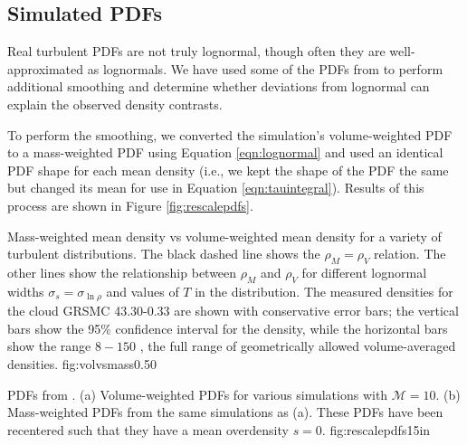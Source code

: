 % 

\subsection{Simulated PDFs}
\label{sec:simpdfs}
Real turbulent PDFs are not truly lognormal, though often they are
well-approximated as lognormals.  We have used some of the PDFs from
\citet{Federrath2012a} to perform additional smoothing and determine
whether deviations from lognormal can explain the observed density contrasts.

To perform the smoothing, we converted the simulation's volume-weighted PDF to
a mass-weighted PDF using Equation \ref{eqn:lognormal} and used an identical
PDF shape for each mean density (i.e., we kept the shape of the PDF the same
but changed its mean for use in Equation \ref{eqn:tauintegral}).  Results of this process
are shown in Figure \ref{fig:rescalepdfs}.

{Mass-weighted mean density vs volume-weighted mean density for a variety of
turbulent distributions.  The black dashed line shows the $\rho_M = \rho_V$
relation.  The other lines show the relationship between $\rho_M$ and $\rho_V$
for different lognormal widths $\sigma_s = \sigma_{\ln \rho}$ and values of $T$
in the \citet{Hopkins2013a} distribution.  The measured densities for the cloud
GRSMC 43.30-0.33 are shown with conservative error bars; the vertical bars show
the 95\% confidence interval for the \formaldehyde density, while the
horizontal bars show the range $8-150$ \percc, the full range of geometrically
allowed volume-averaged densities.
}{fig:volvsmass}{0.5}{0}

{PDFs from \citet{Federrath2012a}.  (a) Volume-weighted PDFs for various
simulations with $\mathcal{M}=10$.  (b) Mass-weighted PDFs from the same
simulations as (a).  These PDFs have been recentered such that they
have a mean overdensity $s=0$.
}{fig:rescalepdfs}{1}{5in}

